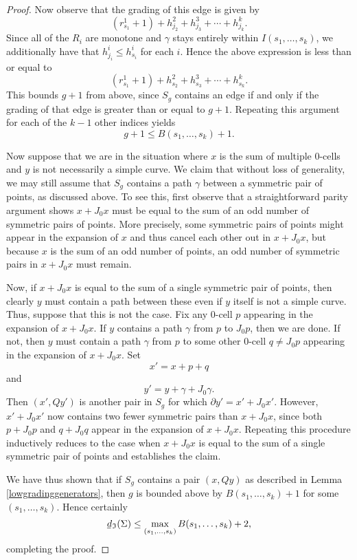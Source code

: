 \documentclass[11 pt]{amsart}
\theoremstyle{remark}
\newcommand{\bunderline}[1]{\underline{#1\mkern-2mu}\mkern2mu }
\def\dl {\bunderline{d}}
\def\Inv{\mathfrak{I}}
\begin{document}
\begin{proof}
Now observe that the grading of this edge is given by
\[
(r_{s_1}^1 + 1) + h_{j_2}^2 + h_{j_3}^3 + \cdots + h_{j_k}^k.
\]
Since all of the $R_i$ are monotone and $\gamma$ stays entirely within $I(s_1, \ldots, s_k)$, we additionally have that $h^i_{j_i} \leq h^i_{s_i}$ for each $i$. Hence the above expression is less than or equal to
\[
(r_{s_1}^1 + 1) + h_{s_2}^2 + h_{s_3}^3 + \cdots + h_{s_k}^k.
\]
This bounds $g+1$ from above, since $S_g$ contains an edge if and only if the grading of that edge is greater than or equal to $g+1$. Repeating this argument for each of the $k-1$ other indices yields
\[
g + 1 \leq  B(s_1, \ldots, s_k) + 1.
\]

Now suppose that we are in the situation where $x$ is the sum of multiple 0-cells and $y$ is not necessarily a simple curve. We claim that without loss of generality, we may still assume that $S_g$ contains a path $\gamma$ between a symmetric pair of points, as discussed above. To see this, first observe that a straightforward parity argument shows $x + J_0x$ must be equal to the sum of an odd number of symmetric pairs of points. More precisely, some symmetric pairs of points might appear in the expansion of $x$ and thus cancel each other out in $x + J_0x$, but because $x$ is the sum of an odd number of points, an odd number of symmetric pairs in $x + J_0x$ must remain.

Now, if $x + J_0x$ is equal to the sum of a single symmetric pair of points, then clearly $y$ must contain a path between these even if $y$ itself is not a simple curve. Thus, suppose that this is not the case. Fix any 0-cell $p$ appearing in the expansion of $x + J_0x$. If $y$ contains a path $\gamma$ from $p$ to $J_0p$, then we are done. If not, then $y$ must contain a path $\gamma$ from $p$ to some other 0-cell $q \neq J_0p$ appearing in the expansion of $x + J_0x$. Set 
\[
x' = x + p + q
\]
and 
\[
y' = y + \gamma + J_0\gamma.
\]
Then $(x', Qy')$ is another pair in $S_g$ for which $\partial y' = x' + J_0x'$. However, $x' + J_0x'$ now contains two fewer symmetric pairs than $x + J_0x$, since both $p + J_0p$ and $q + J_0q$ appear in the expansion of $x + J_0x$. Repeating this procedure inductively reduces to the case when $x + J_0x$ is equal to the sum of a single symmetric pair of points and establishes the claim.

We have thus shown that if $S_g$ contains a pair $(x, Qy)$ as described in Lemma \ref{lowgradinggenerators}, then $g$ is bounded above by $B(s_1, \ldots, s_k) + 1$ for some $(s_1, \ldots, s_k)$. Hence certainly
\[
\dl_{\Inv}(\Sigma) \leq \max_{(s_1, \ldots, s_k)} B(s_1, \ldots, s_k) + 2,
\]
completing the proof.
\end{proof}
\end{document}
